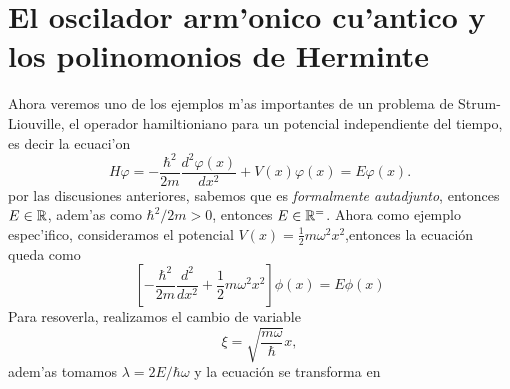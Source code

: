 \documentclass[main.tex]{subfiles}
\begin{document}
\section*{El oscilador arm'onico cu'antico y los polinomonios de Herminte}
\noindent Ahora veremos uno de los ejemplos m'as importantes de un problema de Strum-Liouville, el operador hamiltioniano para un potencial independiente del tiempo, es decir la ecuaci'on
\begin{equation}\label{hamilton}
    H\varphi=-\frac{\hbar^2}{2m} \frac{d^2 \varphi(x)}{dx^2} + V(x) \varphi(x) = E \varphi(x).
\end{equation}
por las discusiones anteriores, sabemos que es \emph{formalmente autadjunto}, entonces $E\in\mathbb R $, adem'as como $\hbar^{2}/2m>0$, entonces $E\in\mathbb R ^{=}$. Ahora como ejemplo espec'ifico, consideramos el potencial $V(x) = \frac{1}{2}m\omega^{2}x^2$,entonces la ecuación queda como
\begin{equation}
\left[-\frac{\hbar^2}{2m}\frac{d^2}{dx^2} + \frac{1}{2}m\omega^2x^2\right]\phi(x) = E\phi(x)
\end{equation}
Para resoverla, realizamos el cambio de variable
\[
  \xi = \sqrt{\frac{m\omega}{\hbar}}x,
\]
\noindent adem'as tomamos $\lambda = 2E/\hbar\omega$ y la ecuación se transforma en
\end{document}
